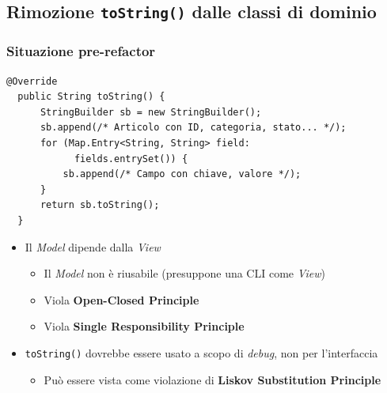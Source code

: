 \subsection{Rimozione \texttt{toString()} dalle classi di dominio}
\begin{frame}[fragile]
  \frametitle{Situazione pre-refactor}
  \begin{lstlisting}[autogobble, title={\texttt{toString()} di \texttt{Article.java}}]
  @Override
  public String toString() {
      StringBuilder sb = new StringBuilder();
      sb.append(/* Articolo con ID, categoria, stato... */);
      for (Map.Entry<String, String> field:
            fields.entrySet()) {
          sb.append(/* Campo con chiave, valore */);
      }
      return sb.toString();
  }
  \end{lstlisting}

  \begin{itemize}
    \item Il \emph{Model} dipende dalla \emph{View}
    \begin{itemize}
      \item Il \emph{Model} non è riusabile (presuppone una CLI come \emph{View})
      \item Viola \textbf{Open-Closed Principle}
      \item Viola \textbf{Single Responsibility Principle}
    \end{itemize}
    \item \texttt{toString()} dovrebbe essere usato a scopo di \emph{debug}, non per l'interfaccia
    \begin{itemize}
      \item Può essere vista come violazione di \textbf{Liskov Substitution Principle}
    \end{itemize}
  \end{itemize}
\end{frame}


